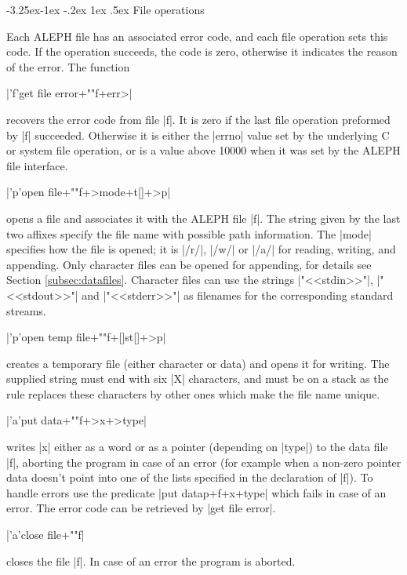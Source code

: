 \documentclass[titlepage]{article}
\makeatletter
\newcommand\A{\textsf{ALEPH}}
\newcommand\g[1]{\textsf{\color{blue!90!black}#1}}
\renewcommand\subsection{%
\@startsection{subsection}{2}{\z@}%
   {-3.25ex\@plus -1ex \@minus -.2ex}%
   {1ex \@plus .5ex}%
   {\normalfont\normalsize\bfseries}}
\makeatother
\begin{document}
\subsection{File operations}

Each \A{} file has an associated error code, and each file operation sets
this code. If the operation succeeds, the code is zero, otherwise it
indicates the reason of the error. The function

\pp|'f'get file error+""f+err>|

\noindent
recovers the error code from file \pp|f|. It is zero if the last file
operation preformed by \pp|f| succeeded. Otherwise it is either the
\pp|errno| value set by the underlying {\sf C} or system file operation, or
is a value above 10000 when it was set by the \A{} file interface.

\pp|'p'open file+""f+>mode+t[]+>p|

\noindent
opens a file and associates it with the \A{} file \pp|f|. The string given
by the last two affixes specify the file name with possible path
information. The \pp|mode| specifies how the file is opened; it is \pp|/r/|,
\pp|/w/| or \pp|/a/| for reading, writing, and appending. Only character
files can be opened for appending, for details see Section
\ref{subsec:datafiles}. Character files can use the strings
\pp|"<<stdin>>"|, \pp|"<<stdout>>"| and \pp|"<<stderr>>"| as filenames for
the corresponding standard streams.

\pp|'p'open temp file+""f+[]st[]+>p| 

\noindent
creates a temporary file (either character or data) and opens it for
writing. The supplied string must end with six \pp|X| characters, and must
be on a \g{stack} as the rule replaces these characters by other ones
which make the file name unique.

\pp|'a'put data+""f+>x+>type| 

\noindent
writes \pp|x| either as a word or as a pointer (depending on \pp|type|) to
the data file \pp|f|, aborting the program in case of an error (for example
when a non-zero pointer data doesn't point into one of the lists specified
in the declaration of \pp|f|). To handle errors use the predicate \pp|put
datap+f+x+type| which fails in case of an error. The error code can be
retrieved by \pp|get file error|.

\pp|'a'close file+""f|

\noindent
closes the file \pp|f|. In case of an error the program is aborted. 
\end{document}

